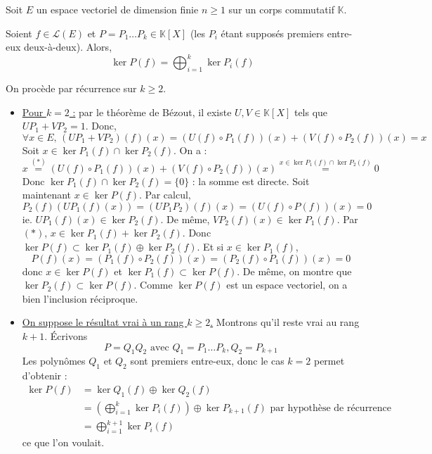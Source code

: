 




	
	Soit $E$ un espace vectoriel de dimension finie $n \geq 1$ sur un corps commutatif $\mathbb{K}$.

	\begin{lemma}
		\label{lemme-des-noyaux-1}
		Soient $f \in \mathcal{L}(E)$ et $P = P_1 \dots P_k \in \mathbb{K}[X]$ (les $P_i$ étant supposés premiers entre-eux deux-à-deux). Alors,
		\[ \ker{P(f)} = \bigoplus_{i = 1}^k \ker{P_i(f)} \]
	\end{lemma}

	\begin{demonstration}
		On procède par récurrence sur $k \geq 2$.
		\begin{itemize}
			\item \underline{Pour $k = 2$ :} par le théorème de Bézout, il existe $U, V \in \mathbb{K}[X]$ tels que $UP_1 + VP_2 = 1$. Donc,
			\[ \forall x \in E, \, (UP_1 + VP_2)(f)(x) = (U(f) \circ P_1(f))(x) + (V(f) \circ P_2(f))(x) = x \tag{$*$} \]
			Soit $x \in \ker{P_1(f)} \cap \ker{P_2(f)}$. On a :
			\[ x \overset{(*)}{=} (U(f) \circ P_1(f))(x) + (V(f) \circ P_2(f))(x) \overset{x \in \ker{P_1(f)} \cap \ker{P_2(f)}}{=} 0 \]
			Donc $\ker{P_1(f)} \cap \ker{P_2(f)} = \{ 0 \}$ : la somme est directe.
			\newpar
			Soit maintenant $x \in \ker{P(f)}$. Par calcul,
			\[ P_2(f)(UP_1(f)(x)) = (UP_1P_2)(f)(x) = (U(f) \circ P(f))(x) = 0 \]
			ie. $UP_1(f)(x) \in \ker{P_2(f)}$. De même, $VP_2(f)(x) \in \ker{P_1(f)}$. Par $(*)$, $x \in \ker{P_1(f)} + \ker{P_2(f)}$. Donc $\ker{P(f)} \subset \ker{P_1(f)} \oplus \ker{P_2(f)}$.
			\newpar
			Et si $x \in \ker{P_1(f)}$,
			\[ P(f)(x) = (P_1(f) \circ P_2(f))(x) = (P_2(f) \circ P_1(f))(x) = 0 \]
			donc $x \in \ker{P(f)}$ et $\ker{P_1}(f) \subset \ker{P(f)}$. De même, on montre que $\ker{P_2}(f) \subset \ker{P(f)}$. Comme $\ker{P(f)}$ est un espace vectoriel, on a bien l'inclusion réciproque.
			\item \underline{On suppose le résultat vrai à un rang $k \geq 2$.} Montrons qu'il reste vrai au rang $k+1$. Écrivons
			\[ P = Q_1Q_2 \text{ avec } Q_1 = P_1 \dots P_k, Q_2 = P_{k+1} \]
			Les polynômes $Q_1$ et $Q_2$ sont premiers entre-eux, donc le cas $k = 2$ permet d'obtenir :
			\begin{align*}
				\ker{P(f)} &= \ker{Q_1(f)} \oplus \ker{Q_2(f)} \\
				&= \left( \bigoplus_{i = 1}^k \ker{P_i(f)} \right) \oplus \ker{P_{k+1}(f)} \text{ par hypothèse de récurrence} \\
				&= \bigoplus_{i = 1}^{k+1} \ker{P_i(f)}
			\end{align*}
			ce que l'on voulait.
		\end{itemize}
	\end{demonstration}

